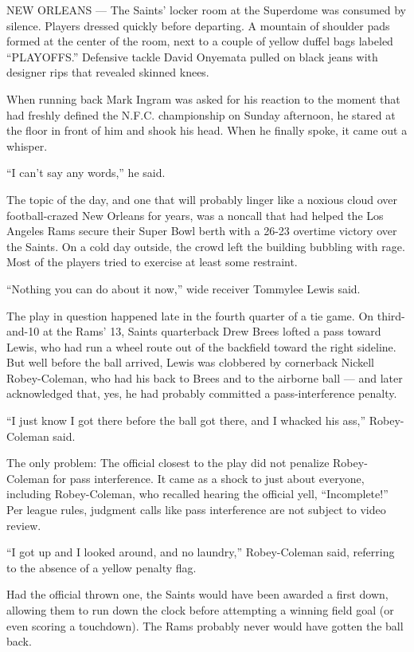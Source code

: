NEW ORLEANS --- The Saints' locker room at the Superdome was consumed by
silence. Players dressed quickly before departing. A mountain of
shoulder pads formed at the center of the room, next to a couple of
yellow duffel bags labeled ``PLAYOFFS.'' Defensive tackle David Onyemata
pulled on black jeans with designer rips that revealed skinned knees.

When running back Mark Ingram was asked for his reaction to the moment
that had freshly defined the N.F.C. championship on Sunday afternoon, he
stared at the floor in front of him and shook his head. When he finally
spoke, it came out a whisper.

``I can't say any words,'' he said.

The topic of the day, and one that will probably linger like a noxious
cloud over football-crazed New Orleans for years, was a noncall that had
helped the Los Angeles Rams secure their Super Bowl berth with a 26-23
overtime victory over the Saints. On a cold day outside, the crowd left
the building bubbling with rage. Most of the players tried to exercise
at least some restraint.

``Nothing you can do about it now,'' wide receiver Tommylee Lewis said.

The play in question happened late in the fourth quarter of a tie game.
On third-and-10 at the Rams' 13, Saints quarterback Drew Brees lofted a
pass toward Lewis, who had run a wheel route out of the backfield toward
the right sideline. But well before the ball arrived, Lewis was
clobbered by cornerback Nickell Robey-Coleman, who had his back to Brees
and to the airborne ball --- and later acknowledged that, yes, he had
probably committed a pass-interference penalty.

``I just know I got there before the ball got there, and I whacked his
ass,'' Robey-Coleman said.

The only problem: The official closest to the play did not penalize
Robey-Coleman for pass interference. It came as a shock to just about
everyone, including Robey-Coleman, who recalled hearing the official
yell, ``Incomplete!'' Per league rules, judgment calls like pass
interference are not subject to video review.

``I got up and I looked around, and no laundry,'' Robey-Coleman said,
referring to the absence of a yellow penalty flag.

Had the official thrown one, the Saints would have been awarded a first
down, allowing them to run down the clock before attempting a winning
field goal (or even scoring a touchdown). The Rams probably never would
have gotten the ball back.

